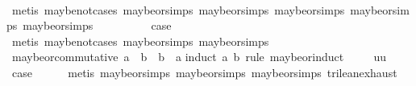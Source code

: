 \begin{isabellebody}
\ \ \ \ \isamarkupfalse%
\ {\isacharparenleft}metis\ maybe{\isacharunderscore}not{\isachardot}cases\ maybe{\isacharunderscore}or{\isachardot}simps{\isacharparenleft}{}{\isacharparenright}\ maybe{\isacharunderscore}or{\isachardot}simps{\isacharparenleft}{}{\isacharparenright}\ maybe{\isacharunderscore}or{\isachardot}simps{\isacharparenleft}{}{\isacharparenright}\ maybe{\isacharunderscore}or{\isachardot}simps{\isacharparenleft}{}{\isacharparenright}\ maybe{\isacharunderscore}or{\isachardot}simps{\isacharparenleft}{}{\isacharparenright}{\isacharparenright}\isanewline
{}\isamarkupfalse%
\isanewline
\ \ \isamarkupfalse%
\ {}\isanewline
\ \ \isamarkupfalse%
\ \isamarkupfalse%
\ {\isacharquery}case\isanewline
\ \ \ \ \isamarkupfalse%
\ {\isacharparenleft}metis\ maybe{\isacharunderscore}not{\isachardot}cases\ maybe{\isacharunderscore}or{\isachardot}simps{\isacharparenleft}{}{\isacharparenright}\ maybe{\isacharunderscore}or{\isachardot}simps{\isacharparenleft}{}{\isacharparenright}{\isacharparenright}\isanewline
{}\isamarkupfalse%
%
\endisatagproof
{\isafoldproof}%
%
\isadelimproof
\isanewline
%
\endisadelimproof
\isanewline
{}\isamarkupfalse%
\ maybe{\isacharunderscore}or{\isacharunderscore}commutative{\isacharcolon}\ {\isachardoublequoteopen}a\ {\isasymor}\isactrlsub {\isacharquery}\ b\ {\isacharequal}\ b\ {\isasymor}\isactrlsub {\isacharquery}\ a{\isachardoublequoteclose}\isanewline
%
\isadelimproof
%
\endisadelimproof
%
\isatagproof
{}\isamarkupfalse%
{\isacharparenleft}induct\ a\ b\ rule{\isacharcolon}\ maybe{\isacharunderscore}or{\isachardot}induct{\isacharparenright}\isanewline
\ \ \isamarkupfalse%
\ {\isacharparenleft}{}\ uu{\isacharparenright}\isanewline
\ \ \isamarkupfalse%
\ \isamarkupfalse%
\ {\isacharquery}case\isanewline
\ \ \ \ \isamarkupfalse%
\ {\isacharparenleft}metis\ maybe{\isacharunderscore}or{\isachardot}simps{\isacharparenleft}{}{\isacharparenright}\ maybe{\isacharunderscore}or{\isachardot}simps{\isacharparenleft}{}{\isacharparenright}\ maybe{\isacharunderscore}or{\isachardot}simps{\isacharparenleft}{}{\isacharparenright}\ trilean{\isachardot}exhaust{\isacharparenright}\isanewline
{}\isamarkupfalse%
\isanewline
\ \ \isamarkupfalse%
\ {\isachardoublequoteopen}{}{\isacharunderscore}{}{\isachardoublequoteclose}\isanewline

\end{isabellebody}
